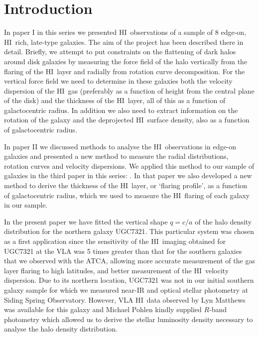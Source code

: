 \documentclass[traditabstract]{aa} %
\newcommand\HI{H{\small I}}
\begin{document}
\section{Introduction}

In paper I in this series \citep{ofk2008a} we presented \HI\
observations of a sample of 8 edge-on, \HI\ rich, late-type galaxies.
The aim of the project has been described there in detail. Briefly,
we attempt to put constraints on the flattening of dark halos around
disk galaxies by measuring the force field of the halo vertically
from the flaring of the \HI\ layer and radially from rotation curve
decomposition. For the vertical force field we need to determine
in these galaxies both the velocity dispersion of the \HI\ gas
(preferably as a function of height from the central plane of the
disk) and the thickness of the \HI\ layer, all of this as a function
of galactocentric radius. In addition we also need to extract
information on the rotation of the galaxy and the deprojected
\HI\ surface density, also as a function of galactocentric radius.

In paper II \citep{ofk2008b} we discussed methods to analyse the \HI\
observations in edge-on galaxies and presented a new method to 
measure the radial distributions, rotation curves and velocity
dispersions. We applied this method to our sample of 
galaxies in the third paper in this series: \citet{ofk2008c}. In that paper
we also developed a new method to derive the thickness of the \HI\ layer, 
or `flaring profile', 
as a function of galactocentric radius, which we used to measure the
\HI\ flaring of each galaxy in our sample. 

In the present paper we have fitted the vertical shape $q=c/a$ of the halo
density distribution for the northern galaxy UGC7321. This particular system 
was chosen as a first application since 
the sensitivity of the \HI\ imaging obtained for UGC7321 at
the VLA was 5 times greater than that for the southern galaxies that we
observed with the ATCA, allowing more accurate measurement of the
gas layer flaring to high latitudes, and better measurement of the \HI\
velocity dispersion. Due to its northern location, UGC7321 was not in
our initial southern galaxy sample for which we measured near-IR and
optical stellar photometry at Siding Spring Observatory. 
However, VLA \HI\ data observed by Lyn Matthews \citep{mgvd1999} 
was available for this galaxy and Michael Pohlen \citep{pdla2002} kindly
supplied $R$-band photometry which allowed us to derive the
stellar luminosity density necessary to analyse the halo density
distribution.
\end{document}
